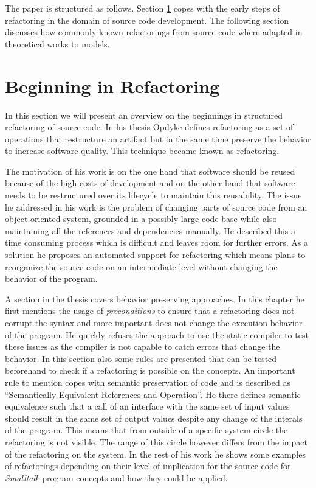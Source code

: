 \documentclass{llncs}
\begin{document}
The paper is structured as follows. Section \ref{sec:beginning} copes with the early steps of refactoring in the domain of source code development. The following section discusses how commonly known refactorings from source code where adapted in theoretical works to models.

\section{Beginning in Refactoring}
\label{sec:beginning}

In this section we will present an overview on the beginnings in structured refactoring of source code. In his thesis \cite{mast:REFOOF} Opdyke defines refactoring as a set of operations that restructure an artifact but in the same time preserve the behavior to increase software quality. This technique became known as refactoring.

The motivation of his work is on the one hand that software should be reused because of the high costs of development and on the other hand that software needs to be restructured over its lifecycle to maintain this reusability. The issue he addressed in his work is the problem of changing parts of source code from an object oriented system, grounded in a possibly large code base while also maintaining all the references and dependencies manually. He described this a time consuming process which is difficult and leaves room for further errors. As a solution he proposes an automated support for refactoring which means plans to reorganize the source code on an intermediate level without changing the behavior of the program.

A section in the thesis covers behavior preserving approaches. In this chapter he first mentions the usage of \textit{preconditions} to ensure that a refactoring does not corrupt the syntax and more important does not change the execution behavior of the program. He quickly refuses the approach to use the static compiler to test these issues as the compiler is not capable to catch errors that change the behavior. In this section also some rules are presented that can be tested beforehand to check if a refactoring is possible on the concepts. An important rule to mention copes with semantic preservation of code and is described as ``Semantically Equivalent References and Operation''. He there defines semantic equivalence such that a call of an interface with the same set of input values should result in the same set of output values despite any change of the interals of the program. This means that from outside of a specific system circle the refactoring is not visible. The range of this circle however differs from the impact of the refactoring on the system. In the rest of his work he shows some examples of refactorings depending on their level of implication for the source code for \textit{Smalltalk} program concepts and how they could be applied.
\end{document}
